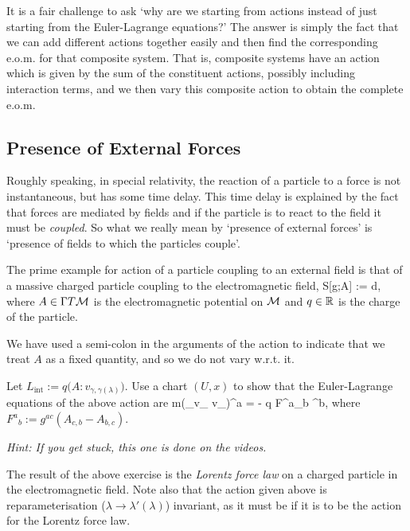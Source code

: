 It is a fair challenge to ask `why are we starting from actions instead of just starting from the Euler-Lagrange equations?' The answer is simply the fact that we can add different actions together easily and then find the corresponding e.o.m. for that composite system. That is, composite systems have an action which is given by the sum of the constituent actions, possibly including interaction terms, and we then vary this composite action to obtain the complete e.o.m. 

\subsection{Presence of External Forces}

Roughly speaking, in special relativity, the reaction of a particle to a force is not instantaneous, but has some time delay. This time delay is explained by the fact that forces are mediated by fields and if the particle is to react to the field it must be \textit{coupled}. So what we really mean by `presence of external forces' is `presence of fields to which the particles couple'.

The prime example for action of a particle coupling to an external field is that of a massive charged particle coupling to the electromagnetic field, 
\bse 
    S[g;A] := \int d\lambda {},
\ese 
where $A\in \Gamma T\mathcal{M}$ is the electromagnetic potential on $\mathcal{M}$ and $q\in\mathbb{R}$ is the charge of the particle. 

\bnn 
    We have used a semi-colon in the arguments of the action to indicate that we treat $A$ as a fixed quantity, and so we do not vary w.r.t. it. 
\enn 

\bbox 
    Let $L_{\text{int}} := q\big(A:v_{\gamma,\gamma(\lambda)}\big)$. Use a chart $(U,x)$ to show that the Euler-Lagrange equations of the above action are 
    \bse 
        m\big(\nabla_{v_{\gamma}} v_{\gamma}\big)^a = - q {F^a}_b \dot{\gamma}^b,
    \ese 
    where ${F^a}_b := g^{ac}(A_{c,b} - A_{b,c})$.
    
    \textit{Hint: If you get stuck, this one is done on the videos.}
\ebox 

The result of the above exercise is the \textit{Lorentz force law} on a charged particle in the electromagnetic field. Note also that the action given above is reparameterisation ($\lambda\to\lambda'(\lambda)$) invariant, as it must be if it is to be the action for the Lorentz force law.

